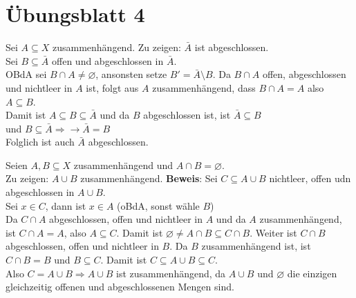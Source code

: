 % 
\section{Übungsblatt 4}

\begin{problem}[1]
  Sei \( A \subseteq X \) zusammenhängend. Zu zeigen: \( \bar{A} \) ist abgeschlossen. \\ 
  Sei \( B \subseteq \bar{A} \) offen und abgeschlossen in \( \bar{A} \). \\
  OBdA sei \( B \cap A \neq \varnothing \), ansonsten setze \( B' = \bar{A} \setminus B \).
  Da \( B \cap A \) offen, abgeschlossen und nichtleer in \( A \) ist, folgt aus \( A \) zusammenhängend, dass 
  \( B \cap A = A \) also \( A \subseteq B \). \\
  Damit ist \( A \subseteq B \subseteq \bar{A} \) und da \( B \) abgeschlossen ist, ist \( \bar{A} \subseteq B \) \\
  und \( B \subseteq \bar{A} \Rightarrow \rightarrow \bar{A} = B \) \\
  Folglich ist auch \( \bar{A} \) abgeschlossen.
\end{problem}

\begin{problem}[1b]
  Seien \( A,B \subseteq X \) zusammenhängend und \( A \cap B = \varnothing \). \\
  Zu zeigen: \( A \cup B \) zusammenhängend.
  \textbf{Beweis}: Sei \( C \subseteq A \cup B \) nichtleer, offen udn abgeschlossen in \( A \cup B \). \\
  Sei \( x \in C \), dann ist \( x \in A \) (oBdA, sonst wähle \( B \))\\
  Da \( C \cap A \) abgeschlossen, offen und nichtleer in \( A \) und da \( A \) zusammenhängend, ist \( C \cap A = A \), also \( A \subseteq C \). Damit ist \( \varnothing \neq A \cap B \subseteq C \cap B \). Weiter ist \( C \cap B \) abgeschlossen, offen und nichtleer in \( B \). Da \( B \) zusammenhängend ist, ist \( C \cap B = B \) und \( B \subseteq C \). Damit ist \( C \subseteq A \cup B \subseteq C \). \\
  Also \( C = A \cup B \Rightarrow A \cup B \) ist zusammenhängend, da \( A \cup B \) und \( \varnothing \) die einzigen gleichzeitig offenen und abgeschlossenen Mengen sind. 
  
\end{problem}

